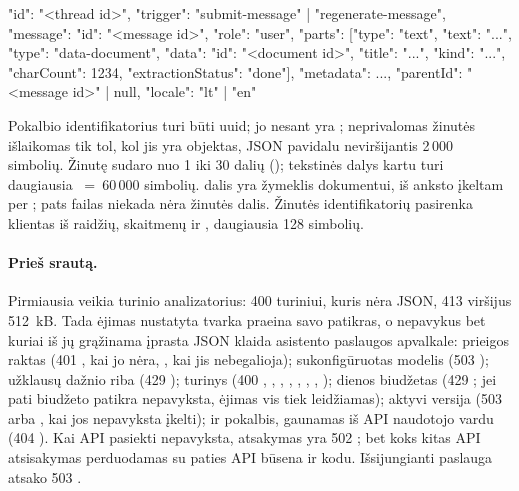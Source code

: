 \begin{codeblock}
{"id": "<thread id>",
 "trigger": "submit-message" | "regenerate-message",
 "message": {"id": "<message id>", "role": "user",
             "parts": [{"type": "text", "text": "..."},
                       {"type": "data-document", "data": {"id": "<document id>", "title": "...",
                        "kind": "...", "charCount": 1234, "extractionStatus": "done"}}],
             "metadata": {...}},
 "parentId": "<message id>" | null,
 "locale": "lt" | "en"}
\end{codeblock}

Pokalbio identifikatorius turi būti uuid;  jo nesant yra ;
neprivalomas žinutės  išlaikomas tik tol, kol jis yra objektas, JSON pavidalu
neviršijantis 2\,000 simbolių. Žinutę sudaro nuo 1 iki 30 dalių (); tekstinės
dalys kartu turi daugiausia ~=~60\,000 simbolių. 
dalis yra žymeklis dokumentui, iš anksto įkeltam per ; pats failas
niekada nėra žinutės dalis. Žinutės identifikatorių pasirenka klientas iš raidžių, skaitmenų ir
, daugiausia 128 simbolių.

\paragraph{Prieš srautą.} Pirmiausia veikia turinio analizatorius: 400 
turiniui, kuris nėra JSON, 413  viršijus 512~kB. Tada ėjimas nustatyta
tvarka praeina savo patikras, o nepavykus bet kuriai iš jų grąžinama įprasta JSON klaida asistento
paslaugos apvalkale: prieigos raktas (401 , kai jo nėra,
, kai jis nebegalioja); sukonfigūruotas modelis (503
); užklausų dažnio riba (429 ); turinys (400
, , , ,
, , , ); dienos
biudžetas (429 ; jei pati biudžeto patikra nepavyksta, ėjimas vis tiek leidžiamas);
aktyvi  versija (503  arba
, kai jos nepavyksta įkelti); ir pokalbis, gaunamas iš API naudotojo
vardu (404 ). Kai API pasiekti nepavyksta, atsakymas yra 502
; bet koks kitas API atsisakymas perduodamas su paties API būsena ir
kodu. Išsijungianti paslauga atsako 503 .

